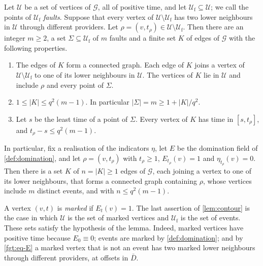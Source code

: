 \begin{lemma}[contours]\label{lem:contour}
Let $\mathcal U$ be a set of vertices of $\mathcal G$, all of positive time, and let $\mathcal U_{\mathrm f}\subseteq\mathcal U$; we call the points of $\mathcal U_{\mathrm f}$ \emph{faults}. Suppose that every vertex of $\mathcal U\setminus\mathcal U_{\mathrm f}$ has two lower neighbours in $\mathcal U$ through different providers. Let $\rho=(v,t_\rho)\in\mathcal U\setminus\mathcal U_{\mathrm f}$. Then there are an integer $m\ge2$, a set $\Sigma\subseteq\mathcal U_{\mathrm f}$ of $m$ faults and a finite set $K$ of edges of $\mathcal G$ with the following properties.
\begin{enumerate}[label=(\roman*)]
\item The edges of $K$ form a connected graph. Each edge of $K$ joins a vertex of $\mathcal U\setminus\mathcal U_{\mathrm f}$ to one of its lower neighbours in $\mathcal U$. The vertices of $K$ lie in $\mathcal U$ and include $\rho$ and every point of $\Sigma$.
\item $1\le|K|\le q^2(m-1)$. In particular $|\Sigma|=m\ge1+|K|/q^2$.
\item Let $s$ be the least time of a point of $\Sigma$. Every vertex of $K$ has time in $[s,t_\rho]$, and $t_\rho-s\le q^2(m-1)$.
\end{enumerate}
In particular, fix a realisation of the indicators $\eta$, let $E$ be the domination field of \cref{def:domination}, and let $\rho=(v,t_\rho)$ with $t_\rho\ge1$, $E_{t_\rho}(v)=1$ and $\eta_{t_\rho}(v)=0$. Then there is a set $K$ of $n=|K|\ge1$ edges of $\mathcal G$, each joining a vertex to one of its lower neighbours, that forms a connected graph containing $\rho$, whose vertices include $m$ distinct events, and with $n\le q^2(m-1)$.
\end{lemma}

A vertex $(v,t)$ is \emph{marked} if $E_t(v)=1$. The last assertion of \cref{lem:contour} is the case in which $\mathcal U$ is the set of marked vertices and $\mathcal U_{\mathrm f}$ is the set of events. These sets satisfy the hypothesis of the lemma. Indeed, marked vertices have positive time because $E_0\equiv0$; events are marked by \cref{def:domination}; and by \eqref{fgt:eq-E} a marked vertex that is not an event has two marked lower neighbours through different providers, at offsets in $\bar D$.

